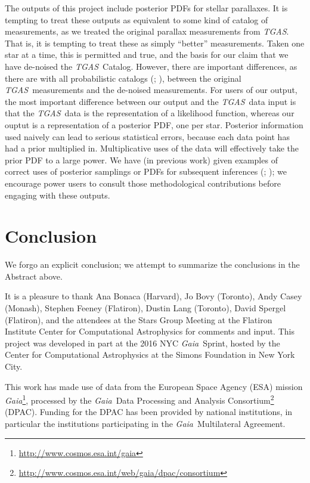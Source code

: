\documentclass[modern]{aastex61}
\newcommand{\acronym}[1]{{\small{#1}}}
\newcommand{\project}[1]{\textsl{#1}}
\newcommand{\tgas}{\project{\acronym{TGAS}}}
\newcommand{\gaia}{\project{Gaia}}
\begin{document}
The outputs of this project include posterior PDFs for stellar parallaxes.
It is tempting to treat these outputs as equivalent to some kind of catalog of
measurements, as we treated the original parallax measurements from \tgas.
That is, it is tempting to treat these as simply ``better'' measurements.
Taken one star at a time, this is permitted and true, and the basis for our
claim that we have de-noised the \tgas\ Catalog.
However, there are important differences, as there are with all
probabilistic catalogs (\citealt{hogg11}; \citealt{portillo17}), between the
original \tgas\ measurements and the de-noised measurements.
For users of our output, the most important difference between our
output and the \tgas\ data input is that the \tgas\ data is the representation
of a likelihood function, whereas our ouptut is a
representation of a posterior PDF, one per star.
Posterior information used naively can lead to serious statistical
errors, because each data point has had a prior multiplied in.
Multiplicative uses of the data will effectively take the prior
PDF to a large power.
We have (in previous work)
given examples of correct uses of posterior samplings or PDFs
for subsequent inferences (\citealt{hogg08}; \citealt{dfm14}); we
encourage power users to consult those methodological
contributions before engaging with these outputs.

\section{Conclusion}
We forgo an explicit conclusion; we attempt to summarize the conclusions in the Abstract above.

\acknowledgments It is a pleasure to thank
  Ana Bonaca (Harvard),
  Jo Bovy (Toronto),
  Andy Casey (Monash),
  Stephen Feeney (Flatiron),
  Dustin Lang (Toronto),
  David Spergel (Flatiron),
and the attendees at the Stars Group Meeting at the Flatiron Institute
Center for Computational Astrophysics for comments and input.
This project was developed in part at the 2016 \acronym{NYC} \gaia\ Sprint, hosted
by the Center for Computational Astrophysics at the Simons Foundation
in New York City.

This work has made use of data from the European Space Agency (\acronym{ESA})
mission \gaia\footnote{\url{http://www.cosmos.esa.int/gaia}}, processed by the \gaia\ Data
Processing and Analysis Consortium\footnote{\url{http://www.cosmos.esa.int/web/gaia/dpac/consortium}} (\acronym{DPAC}). Funding for the
\acronym{DPAC} has been provided by national institutions, in particular the
institutions participating in the \gaia\ Multilateral Agreement.
\end{document}
